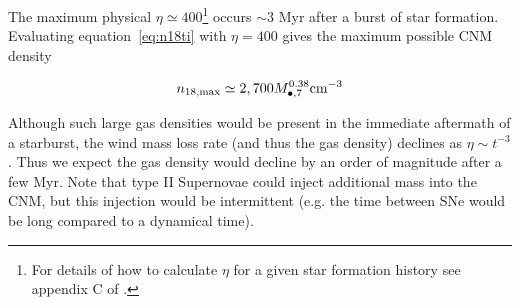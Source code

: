 \documentclass[usenatbib,fleqn]{mnras}
\newcommand{\Mbh}[1][]{M_{\bullet#1}}
\begin{document}
The maximum physical $\eta\simeq 400$\footnote{For details
  of how to calculate $\eta$ for a given star formation history see
  appendix C of \citet{Generozov+2015}.} occurs $\sim 3$ Myr after a
burst of star formation. Evaluating equation~\eqref{eq:n18ti} with
$\eta=400$ gives the maximum possible CNM density

\begin{equation}
n_{\rm 18,max} \simeq 2,700 \Mbh[,7]^{0.38} {\rm cm^{-3}}
\label{eq:n18max}
\end{equation}

Although such large gas densities would be present in the immediate
aftermath of a starburst, the wind mass loss rate (and thus the gas
density) declines as $\eta \sim t^{-3}$. Thus we expect the gas density would
decline by an order of magnitude after a few Myr. Note that type II
Supernovae could inject additional mass into the CNM, but this
injection would be intermittent (e.g. the time between SNe would be
long compared to a dynamical time).



\end{document}
